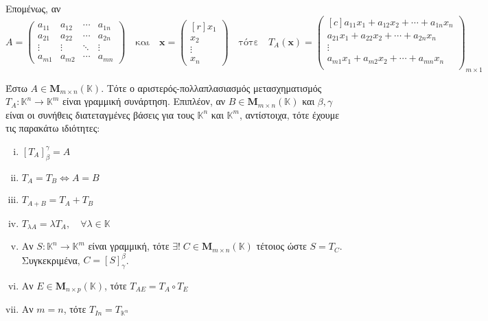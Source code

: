 Επομένως, αν 
\[
  A = 
  \begin{pmatrix}
    a_{11} & a_{12} & \cdots & a_{1n} \\
    a_{21} & a_{22} & \cdots & a_{2n} \\
    \vdots & \vdots & \ddots & \vdots \\
    a_{m1} & a_{m2} & \cdots & a_{mn} 
  \end{pmatrix} \quad \text{και} \quad \mathbf{x} = 
  \begin{pmatrix*}[r] x_{1} \\ x_{2} \\ \vdots \\ x_{n} \end{pmatrix*}
  \quad \text{τότε} \quad T_{A}(\mathbf{x}) = 
  \begin{pmatrix*}[c]
    a_{11} x_{1} + a_{12} x_{2} + \cdots + a_{1n}x_{n} \\
    a_{21} x_{1} + a_{22} x_{2} + \cdots + a_{2n}x_{n} \\ 
    \vdots \\
    a_{m1} x_{1} + a_{m2} x_{2} + \cdots + a_{mn}x_{n} \\ 
  \end{pmatrix*}_{m \times 1}
\] 

\begin{thm}
  Έστω $ A \in \textbf{M}_{m \times n}(\mathbb{K}) $. Τότε ο αριστερός-πολλαπλασιασμός
  μετασχηματισμός $ T_{A} \colon \mathbb{K}^{n} \to \mathbb{K}^{m} $ είναι γραμμική 
  συνάρτηση. Επιπλέον, αν $ B \in \textbf{M}_{m \times n}(\mathbb{K}) $ και $ \beta ,
  \gamma $ είναι οι συνήθεις διατεταγμένες βάσεις για τους $ \mathbb{K}^{n} $ και 
  $ \mathbb{K}^{m} $, αντίστοιχα, τότε έχουμε τις παρακάτω ιδιότητες:
  \begin{enumerate}[i)]
    \item $ [T_{A}]_{\beta}^{\gamma} = A $
    \item $ T_{A} = T_{B} \Leftrightarrow A = B $ 
    \item $ T_{A+B} = T_{A} + T_{B} $
    \item $ T_{\lambda A} = \lambda T_{A}, \quad \forall \lambda \in \mathbb{K} $
    \item Αν $ S \colon \mathbb{K}^{n} \to \mathbb{K}^{m} $ είναι γραμμική, τότε 
      $ \exists ! \; C \in \textbf{M}_{m \times n}(\mathbb{K}) $ τέτοιος ώστε 
      $ S=T_{C} $.  Συγκεκριμένα, $ C = [S]_{\gamma}^{\beta} $.
    \item Αν $ E \in \textbf{M}_{n \times p}(\mathbb{K}) $, τότε $ T_{AE} = T_{A} 
      \circ T_{E} $ 
    \item Αν $ m=n $, τότε $ T_{I{n}} = T_{\mathbb{K}^{n}} $
  \end{enumerate}
\end{thm}

